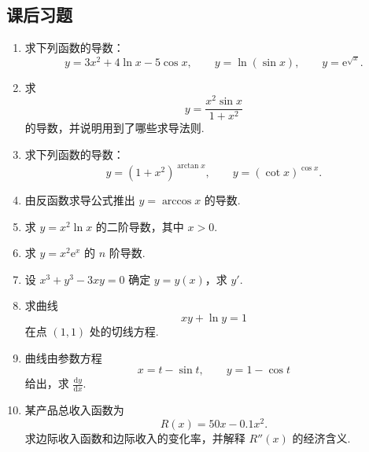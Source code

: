 \documentclass[fontset=fandol]{ctexart}
\newcommand{\dd}{\mathrm{d}}
\newcommand{\ee}{\mathrm{e}}
\begin{document}
\subsection{课后习题}
\begin{enumerate}[label=\textbf{练习\arabic*.},leftmargin=2.2em]
\item 求下列函数的导数：
\[
y=3x^2+4\ln x-5\cos x,\qquad
y=\ln(\sin x),\qquad
y=\ee^{\sqrt{x}}.
\]
\item 求
\[
y=\frac{x^2\sin x}{1+x^2}
\]
的导数，并说明用到了哪些求导法则.
\item 求下列函数的导数：
\[
y=(1+x^2)^{\arctan x},\qquad
y=(\cot x)^{\cos x}.
\]
\item 由反函数求导公式推出 $y=\arccos x$ 的导数.
\item 求 $y=x^2\ln x$ 的二阶导数，其中 $x>0$.
\item 求 $y=x^2\ee^x$ 的 $n$ 阶导数.
\item 设 $x^3+y^3-3xy=0$ 确定 $y=y(x)$，求 $y'$.
\item 求曲线
\[
xy+\ln y=1
\]
在点 $(1,1)$ 处的切线方程.
\item 曲线由参数方程
\[
x=t-\sin t,\qquad y=1-\cos t
\]
给出，求 $\frac{\dd y}{\dd x}$.
\item 某产品总收入函数为
\[
R(x)=50x-0.1x^2.
\]
求边际收入函数和边际收入的变化率，并解释 $R''(x)$ 的经济含义.
\end{enumerate}
\end{document}
